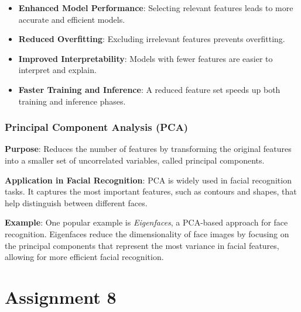 \documentclass{article}
\begin{document}
\begin{itemize}
    \item \textbf{Enhanced Model Performance}: Selecting relevant features leads to more accurate and efficient models.
    \item \textbf{Reduced Overfitting}: Excluding irrelevant features prevents overfitting.
    \item \textbf{Improved Interpretability}: Models with fewer features are easier to interpret and explain.
    \item \textbf{Faster Training and Inference}: A reduced feature set speeds up both training and inference phases.
\end{itemize}
\subsubsection{Principal Component Analysis (PCA)}

\textbf{Purpose}: Reduces the number of features by transforming the original features into a smaller set of uncorrelated variables, called principal components.

\textbf{Application in Facial Recognition}: PCA is widely used in facial recognition tasks. It captures the most important features, such as contours and shapes, that help distinguish between different faces.

\textbf{Example}: One popular example is \textit{Eigenfaces}, a PCA-based approach for face recognition. Eigenfaces reduce the dimensionality of face images by focusing on the principal components that represent the most variance in facial features, allowing for more efficient facial recognition.

\section{Assignment 8}
\end{document}
